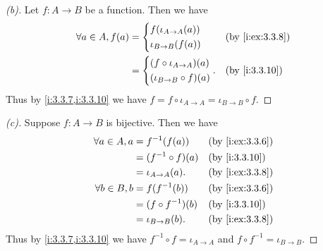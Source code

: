 \begin{proof}[(b)]
  Let \(f : A \to B\) be a function.
  Then we have
  \begin{align*}
    \forall a \in A, f(a) & = \begin{dcases}
                                f(\iota_{A \to A}(a)) \\
                                \iota_{B \to B}(f(a))
                              \end{dcases}        &  & \by{i:ex:3.3.8} \\
                          & = \begin{dcases}
                                (f \circ \iota_{A \to A})(a) \\
                                (\iota_{B \to B} \circ f)(a)
                              \end{dcases}. &  & \by{i:3.3.10}
  \end{align*}
  Thus by \cref{i:3.3.7,i:3.3.10} we have \(f = f \circ \iota_{A \to A} = \iota_{B \to B} \circ f\).
\end{proof}

\begin{proof}[(c)]
  Suppose \(f : A \to B\) is bijective.
  Then we have
  \begin{align*}
    \forall a \in A, a & = f^{-1}(f(a))        &  & \by{i:ex:3.3.6} \\
                       & = (f^{-1} \circ f)(a) &  & \by{i:3.3.10}   \\
                       & = \iota_{A \to A}(a). &  & \by{i:ex:3.3.8} \\
    \forall b \in B, b & = f(f^{-1}(b))        &  & \by{i:ex:3.3.6} \\
                       & = (f \circ f^{-1})(b) &  & \by{i:3.3.10}   \\
                       & = \iota_{B \to B}(b). &  & \by{i:ex:3.3.8}
  \end{align*}
  Thus by \cref{i:3.3.7,i:3.3.10} we have \(f^{-1} \circ f = \iota_{A \to A}\) and \(f \circ f^{-1} = \iota_{B \to B}\).
\end{proof}

